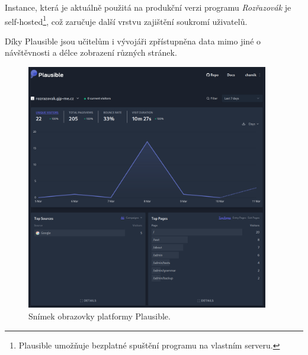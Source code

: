 Instance, která je aktuálně použitá na produkční verzi programu \emph{Rozřazovák} je self-hosted\footnote{Plausible umožňuje bezplatné spuštění programu na vlastním serveru.}, což zaručuje další vrstvu zajištění soukromí uživatelů.

Díky Plausible jsou učitelům i vývojáři zpřístupněna data mimo jiné o návštěvnosti  a délce zobrazení různých stránek.

\begin{figure}[H]
    \centering
    \includegraphics[width=400px]{images/02technologie/plausible.png}
    \caption{Snímek obrazovky platformy Plausible.}
\end{figure}